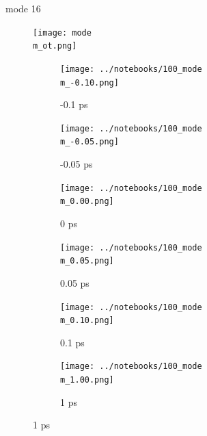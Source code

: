 \documentclass{beamer}
\begin{document}
\renewcommand\m{16}
\begin{frame}{mode \m}
			\vspace{\vh mm}
	\begin{figure}
		\centering
		\texttt{[image: mode\\m\_ot.png]}
	\end{figure}
	\begin{figure}
		\centering
		\begin{subfigure}[b]{\w\textwidth}
			\centering
			\texttt{[image: ../notebooks/100\_mode\\m\_-0.10.png]}
			\caption{-0.1 ps}
		\end{subfigure}
		\begin{subfigure}[b]{\w\textwidth}
			\centering
			\texttt{[image: ../notebooks/100\_mode\\m\_-0.05.png]}
			\caption{-0.05 ps}
		\end{subfigure}
		\begin{subfigure}[b]{\w\textwidth}
			\centering
			\texttt{[image: ../notebooks/100\_mode\\m\_0.00.png]}
			\caption{0 ps}
		\end{subfigure}
		\begin{subfigure}[b]{\w\textwidth}
			\centering
			\texttt{[image: ../notebooks/100\_mode\\m\_0.05.png]}
			\caption{0.05 ps}
		\end{subfigure}
		\begin{subfigure}[b]{\w\textwidth}
			\centering
			\texttt{[image: ../notebooks/100\_mode\\m\_0.10.png]}
			\caption{0.1 ps}
		\end{subfigure}
		\begin{subfigure}[b]{\w\textwidth}
			\centering
			\texttt{[image: ../notebooks/100\_mode\\m\_1.00.png]}
			\caption{1 ps}
		\end{subfigure}
	\end{figure}
\end{frame}
\end{document}
